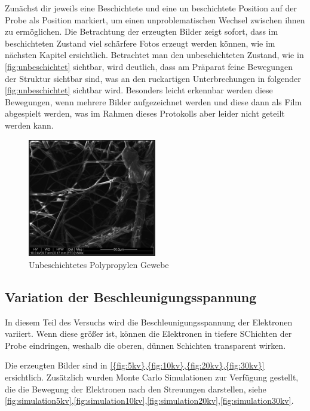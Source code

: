 \documentclass[12pt,english,ngerman]{scrartcl}
\begin{document}
Zunächst dir jeweils eine Beschichtete und eine un beschichtete Position auf der Probe als Position markiert, um einen
unproblematischen Wechsel zwischen ihnen zu ermöglichen. Die Betrachtung der erzeugten Bilder zeigt sofort, dass im 
beschichteten Zustand viel schärfere Fotos erzeugt werden können, wie im nächsten Kapitel ersichtlich. Betrachtet man 
den unbeschichteten Zustand, wie in \autoref{fig:unbeschichtet} sichtbar, wird deutlich, dass am Präparat feine 
Bewegungen der Struktur sichtbar sind, was an den ruckartigen Unterbrechungen in folgender \autoref{fig:unbeschichtet}
sichtbar wird. Besonders leicht erkennbar werden diese Bewegungen, wenn mehrere Bilder aufgezeichnet werden und diese 
dann als Film abgespielt werden, was im Rahmen dieses Protokolls aber leider nicht geteilt werden kann.

\begin{figure}[H]
	\begin{center}
		\includegraphics[width =0.5\textwidth]{./figures/unbedampft.png}
	\end{center}
	\caption{Unbeschichtetes Polypropylen Gewebe}
    \label{fig:unbeschichtet}
\end{figure}

\subsection{Variation der Beschleunigungsspannung}

In diesem Teil des Versuchs wird die Beschleunigungsspannung der Elektronen variiert. Wenn diese größer ist, können die 
Elektronen in tiefere SChichten der Probe eindringen, weshalb die oberen, dünnen Schichten transparent wirken. 

Die erzeugten Bilder sind in \autoref{{fig:5kv},{fig:10kv},{fig:20kv},{fig:30kv}} ersichtlich. 
Zusätzlich wurden Monte Carlo Simulationen zur Verfügung gestellt, die die Bewegung der Elektronen nach den Streuungen
darstellen, siehe \autoref{fig:simulation5kv},\autoref{fig:simulation10kv},\autoref{fig:simulation20kv},\autoref{fig:simulation30kv}.
\end{document}

